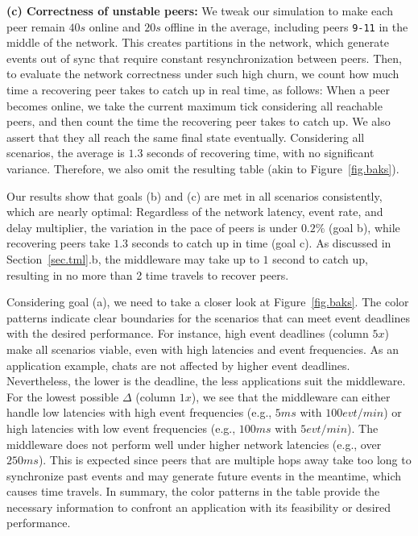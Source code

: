 \documentclass[10pt,journal,compsoc]{IEEEtran}
\newcommand{\code}[1]  {\texttt{\small{#1}}}
\begin{document}
\textbf{(c) Correctness of unstable peers:}
We tweak our simulation to make each peer remain $40s$ online and $20s$
offline in the average, including peers \code{9-11} in the middle of the
network.
This creates partitions in the network, which generate events out of sync that
require constant resynchronization between peers.
%
Then, to evaluate the network correctness under such high churn, we count how
much time a recovering peer takes to catch up in real time, as follows:
When a peer becomes online, we take the current maximum tick considering all
reachable peers, and then count the time the recovering peer takes to catch up.
We also assert that they all reach the same final state eventually.
%
Considering all scenarios, the average is $1.3$ seconds of recovering time,
with no significant variance.
Therefore, we also omit the resulting table (akin to Figure~\ref{fig.baks}).

Our results show that goals (b) and (c) are met in all scenarios consistently,
which are nearly optimal:
Regardless of the network latency, event rate, and delay multiplier,
    the variation in the pace of peers is under $0.2\%$ (goal b), while
    recovering peers take $1.3$ seconds to catch up in time (goal c).
As discussed in Section~\ref{sec.tml}.b, the middleware may take up to $1$
second to catch up, resulting in no more than 2 time travels to recover peers.

Considering goal (a), we need to take a closer look at Figure~\ref{fig.baks}.
The color patterns indicate clear boundaries for the scenarios that can meet
event deadlines with the desired performance.
%
For instance, high event deadlines (column $5x$) make all scenarios viable,
even with high latencies and event frequencies.
As an application example, chats are not affected by higher event deadlines.
Nevertheless, the lower is the deadline, the less applications suit the
middleware.
%
For the lowest possible $\Delta$ (column $1x$), we see that the middleware can
either handle low latencies with high event frequencies (e.g., $5ms$ with
$100evt/min$) or high latencies with low event frequencies (e.g., $100ms$ with
$5evt/min$).
%
The middleware does not perform well under higher network latencies (e.g., over
$250ms$).
This is expected since peers that are multiple hops away take too long to
synchronize past events and may generate future events in the meantime, which
causes time travels.
%
In summary, the color patterns in the table provide the necessary information
to confront an application with its feasibility or desired performance.
\end{document}
